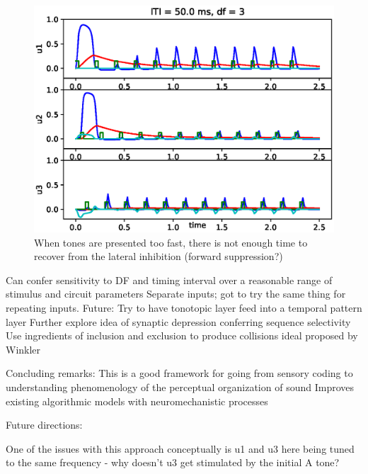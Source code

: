 \begin{figure}
	\centering
	\includegraphics[scale=.8]{ch4Figs/sfa_wc_pop_func_50msITI_df3.eps}
	\caption{When tones are presented too fast, there is not enough time to recover from the lateral inhibition (forward suppression?)}
	\label{fig:tooslow}
\end{figure}

Can confer sensitivity to DF and timing interval over a reasonable range of stimulus and circuit parameters
Separate inputs; got to try the same thing for repeating inputs.
Future:
Try to have tonotopic layer feed into a temporal pattern layer
Further explore idea of synaptic depression conferring sequence selectivity
Use ingredients of inclusion and exclusion to produce collisions ideal proposed by Winkler


Concluding remarks:
This is a good framework for going from sensory coding to understanding phenomenology of the perceptual organization of sound
Improves existing algorithmic models with neuromechanistic processes

Future directions:

One of the issues with this approach conceptually is u1 and u3 here being tuned to the same frequency - why doesn't u3 get stimulated by the initial A tone?

